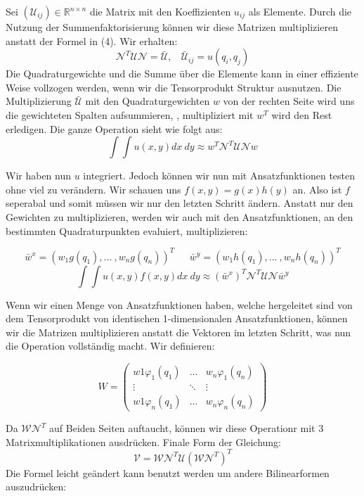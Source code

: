 Sei $(\mathcal{U}_{ij}) \in \mathbb{R}^{n \times n}$ die Matrix mit den Koeffizienten $u_{ij}$ als Elemente.
Durch die Nutzung der Summenfaktorisierung können wir diese Matrizen multiplizieren anstatt der Formel in (4). Wir erhalten: 
\begin{equation}
\mathcal{N}^T \mathcal{U} \mathcal{N} = \bar{\mathcal{U}}, \ \ \ \ \bar{\mathcal{U}}_{ij} = u(q_i,q_j)
\end{equation}
Die Quadraturgewichte und die Summe über die Elemente kann in einer effiziente Weise vollzogen werden, wenn wir die Tensorprodukt Struktur ausnutzen. Die Multiplizierung $\bar{\mathcal{U}}$ mit den Quadraturgewichten $w$ von der rechten Seite wird uns die gewichteten Spalten aufsummieren, , multipliziert mit $w^T$ wird den Rest erledigen. Die ganze Operation sieht wie folgt aus: 
\begin{equation}
\int \int u(x,y) dx \ dy \approx w^T \mathcal{N}^T \mathcal{U} \mathcal{N} w
\end{equation} 

Wir haben nun $u$ integriert. Jedoch können wir nun mit Ansatzfunktionen testen ohne viel zu verändern.
Wir schauen uns $f(x,y)=g(x)h(y)$ an. Also ist $f$ seperabal und somit müssen wir nur den letzten Schritt ändern. Anstatt nur den Gewichten zu multiplizieren, werden wir auch mit den Ansatzfunktionen, an den bestimmten Quadraturpunkten evaluiert, multiplizieren:

\[\bar{w}^x=(w_1 g(q_1), ... \ ,w_n g(q_n))^T \ \ \ \ \ \ \ \bar{w}^y=(w_1 h(q_1), ... \ ,w_n h(q_n))^T\]
\begin{equation}
\int \int u(x,y) f(x,y) dx \ dy \approx (\bar{w}^x)^T \mathcal{N}^T \mathcal{U} \mathcal{N} \bar{w}^y
\end{equation}

Wenn wir einen Menge von Ansatzfunktionen haben, welche hergeleitet sind von dem Tensorprodukt von identischen 1-dimensionalen Ansatzfunktionen, können wir die Matrizen multiplizieren anstatt die Vektoren im letzten Schritt, was nun die Operation vollständig macht. Wir definieren:

\[W=
\begin{pmatrix}
w1 \varphi_1(q_1) & \hdots & w_n \varphi_1(q_n) \\
\vdots & \ddots & \vdots \\
w1 \varphi_n(q_1) & \hdots & w_n \varphi_n(q_n)
\end{pmatrix}
\]

Da  $\mathcal{W} \mathcal{N}^T$ auf Beiden Seiten auftaucht, können wir diese Operationr mit 3 Matrixmultiplikationen ausdrücken. Finale Form der Gleichung:
\begin{equation}
\mathcal{V} = \mathcal{W} \mathcal{N}^T \mathcal{U} (\mathcal{W} \mathcal{N}^T)^T
\end{equation}
Die Formel leicht geändert kann benutzt werden um andere Bilinearformen auszudrücken:

